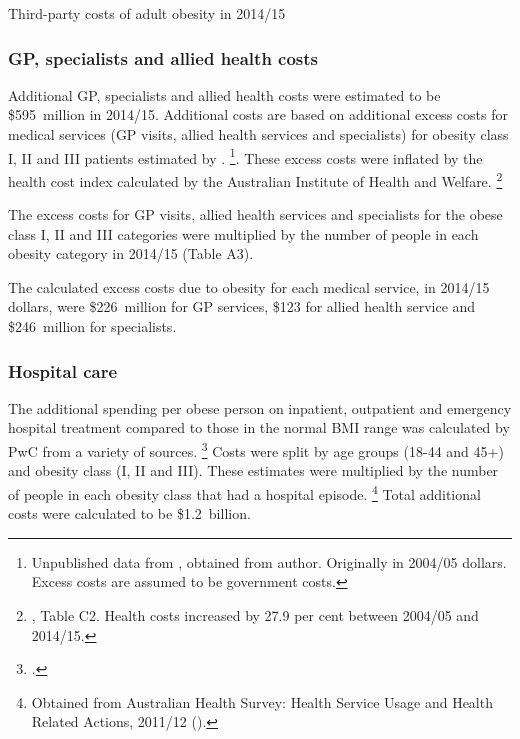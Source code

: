 \documentclass[embargoed]{grattan}
\begin{document}
\begin{table}
\caption{Third-party costs of adult obesity in 2014/15}



\end{table}

\subsubsection{GP, specialists and allied health costs}\label{gp-specialists-and-allied-health-costs}

Additional GP, specialists and allied health costs were estimated to be \$595~million in 2014/15.
Additional costs are based on additional excess costs for medical services (GP visits, allied health services and specialists) for obesity class I, II and III patients estimated by \textcite{Colagiuri2010costoverweightobesity}.%
\footnote{Unpublished data from \textcite{Colagiuri2010costoverweightobesity}, obtained from author.
Originally in 2004/05 dollars.
Excess costs are assumed to be government costs.}.
These excess costs were inflated by the health cost index calculated by the Australian Institute of Health and Welfare.%
\footnote{\textcite{Health2015HealthexpenditureAustralia}, Table C2.
Health costs increased by 27.9 per cent between 2004/05 and 2014/15.}

The excess costs for GP visits, allied health services and specialists for the obese class I, II and III categories were multiplied by the number of people in each obesity category in 2014/15 (Table A3).

The calculated excess costs due to obesity for each medical service, in 2014/15 dollars, were \$226~million for GP services, \$123 for allied health service and \$246~million for specialists.

\subsubsection{Hospital care }\label{hospital-care}

The additional spending per obese person on inpatient, outpatient and emergency hospital treatment compared to those in the normal BMI range was calculated by PwC from a variety of sources.%
\footcite[][48]{PwC2015Weighingcostobesity} Costs were split by age groups (18-44 and 45+) and obesity class (I, II and III).
These estimates were multiplied by the number of people in each obesity class that had a hospital episode.%
\footnote{Obtained from Australian Health Survey: Health Service Usage and Health Related Actions, 2011/12 (\textcite{ABS20134364055002AustralianHealth}).} Total additional costs were calculated to be \$1.2~billion.
\end{document}
